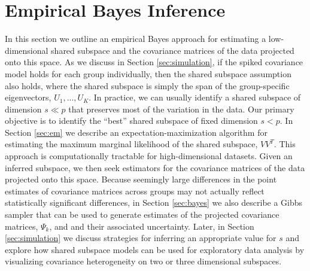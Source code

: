 \documentclass[12pt]{article}
\begin{document}


\section{Empirical Bayes Inference}
\label{sec:inference}

In this section we outline an empirical Bayes approach for estimating
a low-dimensional shared subspace and the covariance matrices of the
data projected onto this space. As we discuss in Section
\ref{sec:simulation}, if the spiked covariance model holds for each
group individually, then the shared subspace assumption also holds,
where the shared subspace is simply the span of the group-specific
eigenvectors, $U_1, ..., U_K$. In practice, we can usually identify a
shared subspace of dimension $s \ll p$ that preserves most of the
variation in the data.  Our primary objective is to identify the
``best'' shared subspace of fixed dimension $s < p$.  In Section
\ref{sec:em} we describe an expectation-maximization algorithm for
estimating the maximum marginal likelihood of the shared subspace,
$VV^T$.  This approach is computationally tractable for
high-dimensional datasets.  Given an inferred subspace, we then seek
estimators for the covariance matrices of the data projected onto this
space.  Because seemingly large differences in the point estimates of
covariance matrices across groups may not actually reflect
statistically significant differences, in Section \ref{sec:bayes} we
also describe a Gibbs sampler that can be used to generate estimates
of the projected covariance matrices, $\Psi_k$, and and their
associated uncertainty.  Later, in Section \ref{sec:simulation} we
discuss strategies for inferring an appropriate value for $s$ and
explore how shared subspace models can be used for exploratory data
analysis by visualizing covariance heterogeneity on two or three
dimensional subspaces.

\end{document}
